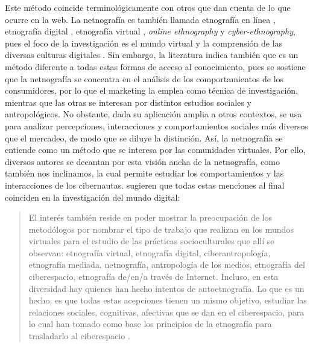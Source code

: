 Este método coincide terminológicamente con otros que dan cuenta de lo
que ocurre en la web. La netnografía es también llamada etnografía en
línea \cite{markham2005methods}, etnografía digital \cite{murthy2008}, etnografía
virtual \cite{hine2000virtual}, \emph{online ethnography} y
\emph{cyber-ethnography}, pues el foco de la investigación es el mundo
virtual \cite{chanona2018}y la comprensión de las diversas
culturas digitales \cite{dominguiez2007}. Sin embargo, la literatura indica
también que es un método diferente a todas estas formas de acceso al
conocimiento, pues se sostiene que la netnografía se concentra en el
análisis de los comportamientos de los consumidores, por lo que el
marketing la emplea como técnica de investigación, mientras que las
otras se interesan por distintos estudios sociales y antropológicos. No
obstante, dada su aplicación amplia a otros contextos, se usa para
analizar percepciones, interacciones y comportamientos sociales más
diversos que el mercadeo, de modo que se diluye la distinción. Así, la
netnografía se entiende como un método que se interesa por las
comunidades virtuales. Por ello, diversos autores se decantan por esta
visión ancha de la netnografía, como también nos inclinamos, 
la cual permite estudiar los comportamientos y las interacciones
de los cibernautas. \textcite{ruiz2015etnografia} sugieren que todas estas
menciones al final coinciden en la investigación del mundo digital:

\begin{quote}
El interés también reside en poder mostrar la preocupación de los
metodólogos por nombrar el tipo de trabajo que realizan en los mundos
virtuales para el estudio de las prácticas socioculturales que allí se
observan: etnografía virtual, etnografía digital, ciberantropología,
etnografía mediada, netnografía, antropología de los medios, etnografía
del ciberespacio, etnografía de/en/a través de Internet. Incluso, en
esta diversidad hay quienes han hecho intentos de autoetnografía. Lo que
es un hecho, es que todas estas acepciones tienen un mismo objetivo,
estudiar las relaciones sociales, cognitivas, afectivas que se dan en el
ciberespacio, para lo cual han tomado como base los principios de la
etnografía para trasladarlo al ciberespacio \citeyear[p. 70]{ruiz2015etnografia}.
\end{quote}


